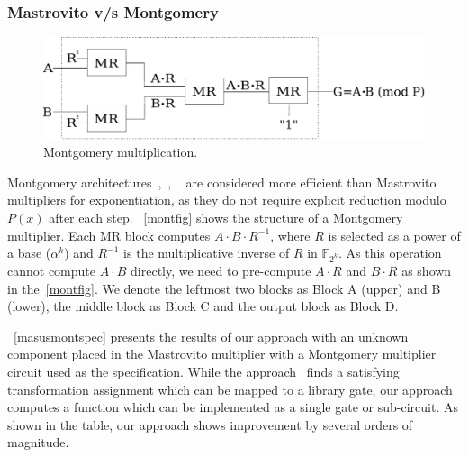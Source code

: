 \subsubsection{Mastrovito v/s Montgomery}
\begin{figure}[H]
  \centering
  \includegraphics[scale=0.34]{new_mmcircuit-eps-converted-to}
  \caption{Montgomery multiplication.}
  \label{montfig}
  \end{figure}
Montgomery architectures~\cite{acar:1998},~\cite{wu:2002},
~\cite{knezevic:2008} are considered more efficient than Mastrovito multipliers for exponentiation, 
as they do not require explicit reduction modulo $P(x)$ after each step.
~\autoref{montfig} shows the structure of a Montgomery
multiplier. Each MR block computes $A\cdot B\cdot R^{-1}$, where $R$
is selected as a power of a base ($\alpha^{k}$) and $R^{-1}$ is the multiplicative 
inverse of $R$ in $\mathbb{F}_{2^k}$. As this operation cannot compute $A\cdot B$
directly, we need to pre-compute $A\cdot R$ and $B\cdot R$ as shown in the~\autoref{montfig}. 
We denote the leftmost
two blocks as Block A (upper) and B (lower), the middle block as Block
C and the output block as Block D.

~\autoref{masusmontspec} presents the results of our approach with an unknown component placed in the Mastrovito multiplier with a Montgomery multiplier circuit used as the specification. While the approach~\cite{fujita:2015} finds a satisfying transformation assignment which can be mapped to a library gate, our approach computes a function which can be implemented as a single gate or sub-circuit. As shown in the table, our approach shows improvement by several orders of magnitude.

